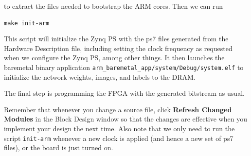 \documentclass[11pt]{article}
\begin{document}
\begin{appendices}
\begin{center}
\end{center}

to extract the files needed to bootstrap the ARM cores. Then we can run

\texttt{make init-arm}

This script will initialize the Zynq PS with the ps7 files generated from the Hardware Description file, including setting the clock frequency as requested when we configure the Zynq PS, among other things. It then launches the baremetal binary application \verb|arm_baremetal_app/system/Debug/system.elf| to initialize the network weights, images, and labels to the DRAM.

The final step is programming the FPGA with the generated bitstream as usual.

Remember that whenever you change a source file, click \textbf{Refresh Changed Modules} in the Block Design window so that the changes are effective when you implement your design the next time. Also note that we only need to run the script \verb|init-arm| whenever a new clock is applied (and hence a new set of ps7 files), or the board is just turned on.
\end{appendices}
\end{document}
